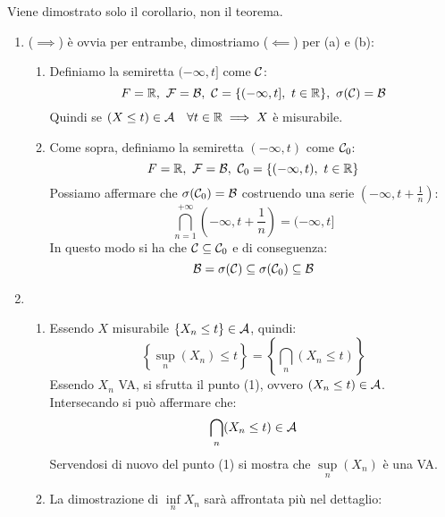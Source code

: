 \begin{dimo}
  Viene dimostrato solo il corollario, non il teorema.
  \begin{enumerate}
    \item
     ($\implies$) è ovvia per entrambe, dimostriamo ($\impliedby$) per (a) e (b):
    \begin{enumerate}
      \item
        Definiamo la semiretta $(-\infty, t]$ come $\mathcal C$:
        $$F = \RR, \ \Fc  = \Bc, \ \Cc = \{(-\infty, t], \ t \in \RR\}, \ \sigma(\Cc) = \Bc$$
        Quindi se $(X \leq t) \in \mathcal A \quad \forall t \in \mathbb R \implies X$ è misurabile.
      \item
        Come sopra, definiamo la semiretta $(-\infty, t)$ come $\mathcal C_0$:
        $$F = \mathbb R, \ \mathcal F  = \mathcal B, \ \mathcal C_0 = \{(-\infty, t), \ t \in \mathbb R\}$$
        Possiamo affermare che $\sigma(\mathcal C_0) = \mathcal B$ costruendo una serie $\left(-\infty, t + \frac{1}{n}\right)$:
        $$\bigcap\limits_{n = 1}^{{+\infty}} \left(-\infty, t + \frac{1}{n}\right) = (-\infty, t]$$
        In questo modo si ha che $\mathcal C \subseteq \mathcal C_0$ e di conseguenza:
        $$\mathcal B = \sigma(\mathcal C) \subseteq \sigma(\mathcal C_0) \subseteq \mathcal B$$
    \end{enumerate}
    \item
    \begin{enumerate}
      \item Essendo $X$ misurabile $\{X_n \leq t\} \in \mathcal A$, quindi:
        $$\left\{\sup\limits_n (X_n) \leq t\right\} = \left\{\bigcap\limits_n (X_n \leq t)\right\}$$
        Essendo $X_n$ VA, si sfrutta il punto (1), ovvero $(X_n \leq t) \in \mathcal A$. Intersecando si può affermare che:
        $$\bigcap\limits_n (X_n \leq t) \in \mathcal A$$
        Servendosi di nuovo del punto (1) si mostra che $\sup\limits_n (X_n)$ è una VA.
      \item La dimostrazione di $\inf\limits_n X_n$ sarà affrontata più nel dettaglio:


\end{enumerate}
\end{enumerate}
\end{dimo}
